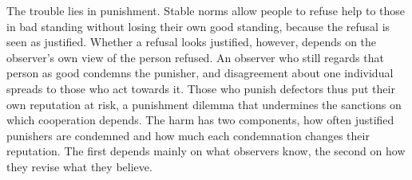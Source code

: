The trouble lies in punishment. Stable norms allow people to refuse help to those in bad standing without losing their own good standing, because the refusal is seen as justified\cite{panchanathan2003,ohtsuki2004,okada2020dilemmas}. Whether a refusal looks justified, however, depends on the observer's own view of the person refused. An observer who still regards that person as good condemns the punisher, and disagreement about one individual spreads to those who act towards it\cite{hilbe2018,uchida2013,radzvilavicius2019}. Those who punish defectors thus put their own reputation at risk, a punishment dilemma that undermines the sanctions on which cooperation depends\cite{okada2020dilemmas,michelmata2024,pires2025}. The harm has two components, how often justified punishers are condemned and how much each condemnation changes their reputation. The first depends mainly on what observers know, the second on how they revise what they believe.
